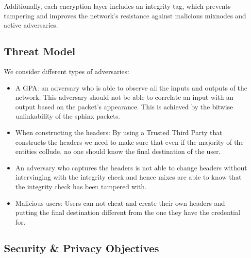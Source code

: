 Additionally, each encryption layer includes an integrity tag, which prevents tampering and improves the network’s resistance against malicious mixnodes and active adversaries.

\subsection{Threat Model} 

We consider different types of adversaries:
\begin{itemize}
	\item A GPA: an adversary who is able to observe all the inputs and outputs of the network. This adversary should not be able to correlate an input with an output based on the packet's appearance. This is achieved by the bitwise unlinkability of the sphinx packets.
	\item When constructing the headers: By using a Trusted Third Party that constructs the headers we need to make sure that even if the majority of the entities collude, no one should know the final destination of the user.
	\item An adversary who captures the headers is not able to change headers without intervinging with the integrity check and hence mixes are able to know that the integrity check has been tampered with.
	\item Malicious users: Users can not cheat and create their own headers and putting the final destination different from the one they have the credential for.
\end{itemize}

\subsection{Security \& Privacy Objectives}
\label{sec:sp-objectives}

